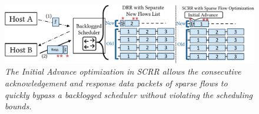 
\begin{figure}[t]
	\centering
        \includegraphics[width=1\linewidth]{figs/ia-crop.pdf}
	\caption{\small{\textit{The Initial Advance optimization in SCRR allows the consecutive acknowledgement and response data packets of sparse flows to quickly bypass a backlogged scheduler without violating the scheduling bounds. }}}
	\label{fig:initial-advance}
	\vspace*{-0.4cm}

\end{figure}

